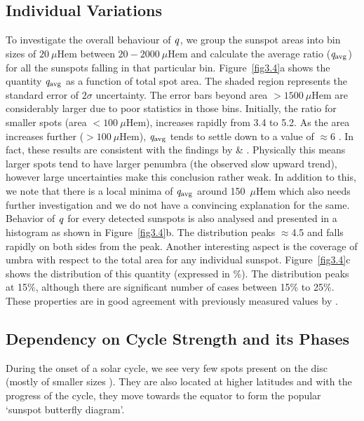 \subsection{Individual Variations}

To investigate the overall behaviour of  $\mathit q$, we group the sunspot areas into bin sizes of $20~\mu$Hem between $20-2000~\mu$Hem and calculate the average ratio ({$\mathit q_{\rm avg}$}) for all the sunspots falling in that particular bin. Figure~\ref{fig3.4}a shows the quantity {$ \mathit q_{\rm avg}$} as a function of total spot area. The shaded region represents the standard error of $2\sigma$ uncertainty. The error bars beyond area $>1500~\mu$Hem are considerably larger due to poor statistics in those bins. Initially, the ratio for smaller spots (area $<100~\mu$Hem), increases rapidly from 3.4 to 5.2. As the area increases further ($>100~\mu$Hem), {$ \mathit q_{\rm avg}$} tends to settle down to a value of $\approx$6 \citep{Jha2018}. In fact, these results are consistent with the findings by \cite{Antalova1971} \& \cite{Hathaway2013}. Physically this means larger spots tend to have larger penumbra (the observed slow upward trend), however large uncertainties make this conclusion rather weak. In addition to this, we note that there is a local minima of {$\mathit q_{\rm avg}$} around 150~$\mu$Hem which also needs further investigation and we do not have a convincing explanation for the same. Behavior of $\mathit q$ for every detected sunspots is also analysed and presented in a histogram as shown in Figure~\ref{fig3.4}b. The distribution peaks $\approx$4.5 and falls rapidly on both sides from the peak. Another interesting aspect is the coverage of umbra with respect to the total area for any individual sunspot. Figure~\ref{fig3.4}c shows the distribution of this quantity (expressed in \%). The distribution peaks at 15\%, although there are significant number of cases between 15\% to 25\%. These properties are in good  agreement with previously measured values by \cite{Watson2011,Carrasco2018}.


\subsection{Dependency on Cycle Strength and its Phases}
During the onset of a solar cycle, we see very few spots present on the disc (mostly of smaller sizes \cite{Mandal2017a}). They are also located at higher latitudes and with the progress of the cycle, they move towards the equator to form the popular `sunspot butterfly diagram'. 

